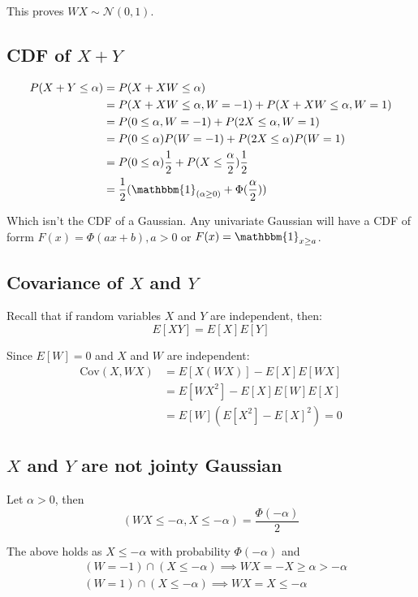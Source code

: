 \documentclass{article}
\begin{document}
This proves \( WX \sim \mathcal{N}(0, 1) \).

\subsection{CDF of $X + Y$}
\begin{align*}
P(X + Y \leq \alpha) &=   P(X + XW \leq \alpha)\\
&=P(X + XW \leq \alpha, W = -1) +  P(X + XW \leq \alpha, W = 1)\\
&= P(0 \leq \alpha, W = -1) + P(2X \leq \alpha, W = 1)\\
&= P(0 \leq \alpha)P(W = -1) + P(2X \leq \alpha)P(W = 1)\\
&= P(0 \leq \alpha)\frac{1}{2} + P(X \leq \frac{\alpha}{2})\frac{1}{2}\\
&= \frac{1}{2}(\mathbbm{1}_{(\alpha \geq 0)} + \Phi(\frac{\alpha}{2}))\\
\end{align*}

Which isn't the CDF of a Gaussian. Any univariate Gaussian will have a CDF of forrm $F(x) = \Phi(ax + b), a > 0$ or $F(x) = \mathbbm{1}_{x \geq a}$.
\subsection{Covariance of $X$ and $Y$}
Recall that if random variables \( X \) and \( Y \) are independent, then:
\[
E[XY] = E[X]E[Y]
\]

Since \( E[W] = 0 \) and \( X \) and \( W \) are independent:
\begin{align*}
\text{Cov}(X, WX) &= E[X(WX)] - E[X]E[WX]\\
&= E[WX^2] - E[X]E[W]E[X]\\
&= E[W](E[X^2] - E[X]^2) = 0
\end{align*}


\subsection{$X$ and $Y$ are not jointy Gaussian}

Let \( \alpha > 0 \), then
\begin{equation}\label{eqn:contrd}
(WX \leq -\alpha, X \leq -\alpha) = \frac{\Phi(-\alpha)}{2}
\end{equation}

The above holds as \( X \leq -\alpha \) with probability \( \Phi(-\alpha) \) and
\begin{align*}
&(W = -1) \cap (X \leq -\alpha) \implies WX = -X \geq \alpha > -\alpha\\
&(W = 1) \cap (X \leq -\alpha) \implies WX = X \leq -\alpha
\end{align*}
\end{document}
